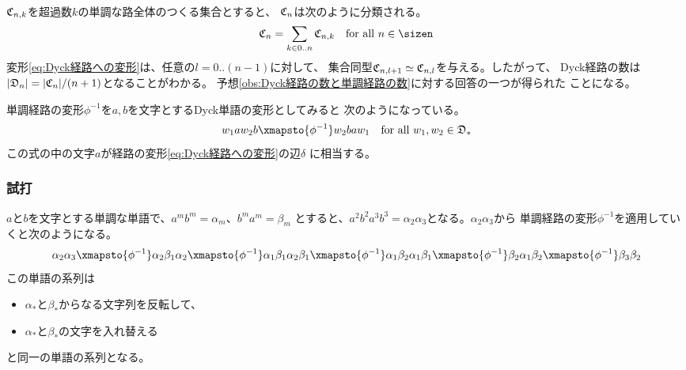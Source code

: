 {\begin{equation*}
\begin{split}
{		}
	\end{split}\end{equation*}
	${\mathfrak C}_{n,k}$を超過数$k$の単調な路全体のつくる集合とすると、
	${\mathfrak C}_n$は次のように分類される。
	\begin{equation*}\begin{split}
		\Cyck_n = \sum_{k\in0..n}\Cyck_{n,k} \quad\text{for all } n\in\sizen
	\end{split}\end{equation*}
	変形\eqref{eq:Dyck経路への変形}は、任意の$l=0..(n-1)$に対して、
	集合同型${\mathfrak C}_{n,l+1}\simeq{\mathfrak C}_{n,l}$を与える。したがって、
	Dyck経路の数は$|{\mathfrak D}_n|=|{\mathfrak C}_n|/(n+1)$となることがわかる。
	予想\ref{obs:Dyck経路の数と単調経路の数}に対する回答の一つが得られた
	ことになる。

	単調経路の変形$\phi^{-1}$を$a,b$を文字とするDyck単語の変形としてみると
	次のようになっている。
	\begin{equation*}\begin{split}
		w_1aw_2b \xmapsto{\phi^{-1}} w_2baw_1
		\quad\text{for all } w_1,w_2\in\Dyck_*
	\end{split}\end{equation*}
	この式の中の文字$a$が経路の変形\eqref{eq:Dyck経路への変形}の辺$\delta$
	に相当する。

\subsubsection{試打}\label{s3:試打} %
	$a$と$b$を文字とする単調な単語で、$a^mb^m=\alpha_m$、$b^ma^m=\beta_m$
	とすると、$a^2b^2a^3b^3=\alpha_2\alpha_3$となる。$\alpha_2\alpha_3$から
	単調経路の変形$\phi^{-1}$を適用していくと次のようになる。
	\begin{equation*}\begin{split}
		\alpha_2\alpha_3 \xmapsto{\phi^{-1}} \alpha_2\beta_1\alpha_2
		\xmapsto{\phi^{-1}} \alpha_1\beta_1\alpha_2\beta_1
		\xmapsto{\phi^{-1}} \alpha_1\beta_2\alpha_1\beta_1
		\xmapsto{\phi^{-1}} \beta_2\alpha_1\beta_2
		\xmapsto{\phi^{-1}} \beta_3\beta_2
	\end{split}\end{equation*}
	この単語の系列は
	\begin{itemize}\setlength{\itemsep}{-1mm} %
		\item $\alpha_*$と$\beta_*$からなる文字列を反転して、
		\item $\alpha_*$と$\beta_*$の文字を入れ替える
	\end{itemize} %
	と同一の単語の系列となる。
}

